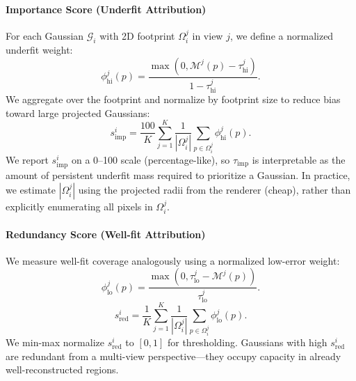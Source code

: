 \documentclass[sigconf]{acmart}
\begin{document}
\paragraph{Importance Score (Underfit Attribution)}
For each Gaussian $\mathcal{G}_i$ with 2D footprint $\Omega_i^j$ in view $j$, we define a normalized underfit weight:
\begin{equation}
    \phi^j_{\text{hi}}(p)= \frac{\max(0, \mathcal{M}^j(p) - \tau^j_{\text{hi}})}{1 - \tau^j_{\text{hi}}}.
\end{equation}
We aggregate over the footprint and normalize by footprint size to reduce bias toward large projected Gaussians:
\begin{equation}
    s^i_{\text{imp}} = \frac{100}{K} \sum_{j=1}^{K} \frac{1}{|\Omega_i^j|} \sum_{p \in \Omega_i^j} \phi^j_{\text{hi}}(p).
\end{equation}
We report $s^i_{\text{imp}}$ on a 0--100 scale (percentage-like), so $\tau_{\text{imp}}$ is interpretable as the amount of persistent underfit mass required to prioritize a Gaussian. In practice, we estimate $|\Omega_i^j|$ using the projected radii from the renderer (cheap), rather than explicitly enumerating all pixels in $\Omega_i^j$.

\paragraph{Redundancy Score (Well-fit Attribution)}
We measure well-fit coverage analogously using a normalized low-error weight:
\begin{equation}
    \phi^j_{\text{lo}}(p)= \frac{\max(0, \tau^j_{\text{lo}} - \mathcal{M}^j(p))}{\tau^j_{\text{lo}}}.
\end{equation}
\begin{equation}
    s^i_{\text{red}} = \frac{1}{K} \sum_{j=1}^{K} \frac{1}{|\Omega_i^j|} \sum_{p \in \Omega_i^j} \phi^j_{\text{lo}}(p).
\end{equation}
We min-max normalize $s^i_{\text{red}}$ to $[0,1]$ for thresholding. Gaussians with high $s^i_{\text{red}}$ are redundant from a multi-view perspective---they occupy capacity in already well-reconstructed regions.
\end{document}
